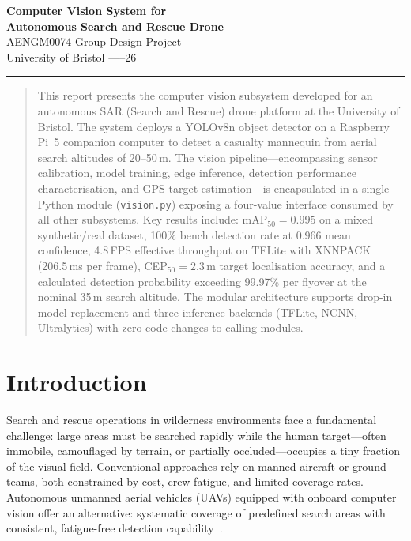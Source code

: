\documentclass[10pt,a4paper]{article}
\begin{document}
\begin{center}
  {\LARGE\bfseries\color{headblue} Computer Vision System for\\[3pt]
  Autonomous Search and Rescue Drone}\\[6pt]
  {\large AENGM0074 Group Design Project}\\[2pt]
  {\small University of Bristol \quad-----26}
\end{center}
\vspace{2pt}
\hrule height 0.6pt
\vspace{6pt}

\begin{abstract}
This report presents the computer vision subsystem developed for an autonomous SAR (Search and Rescue) drone platform at the University of Bristol. The system deploys a YOLOv8n object detector on a Raspberry Pi~5 companion computer to detect a casualty mannequin from aerial search altitudes of 20--50\,m. The vision pipeline---encompassing sensor calibration, model training, edge inference, detection performance characterisation, and GPS target estimation---is encapsulated in a single Python module (\texttt{vision.py}) exposing a four-value interface consumed by all other subsystems. Key results include: mAP$_{50}=0.995$ on a mixed synthetic/real dataset, 100\% bench detection rate at 0.966 mean confidence, 4.8\,FPS effective throughput on TFLite with XNNPACK (206.5\,ms per frame), CEP$_{50}=2.3$\,m target localisation accuracy, and a calculated detection probability exceeding 99.97\% per flyover at the nominal 35\,m search altitude. The modular architecture supports drop-in model replacement and three inference backends (TFLite, NCNN, Ultralytics) with zero code changes to calling modules.
\end{abstract}

\tableofcontents
\vspace{6pt}


\section{Introduction}\label{sec:intro}

Search and rescue operations in wilderness environments face a fundamental challenge: large areas must be searched rapidly while the human target---often immobile, camouflaged by terrain, or partially occluded---occupies a tiny fraction of the visual field. Conventional approaches rely on manned aircraft or ground teams, both constrained by cost, crew fatigue, and limited coverage rates. Autonomous unmanned aerial vehicles (UAVs) equipped with onboard computer vision offer an alternative: systematic coverage of predefined search areas with consistent, fatigue-free detection capability~\cite{rudol2008human}.
\end{document}
